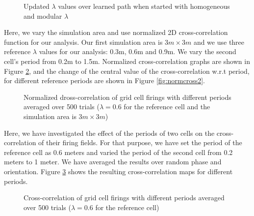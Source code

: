 \documentclass[11pt, letterpaper, onecolumn]{article}
\begin{document}
\begin{figure}[H]
\centering
{}
\caption{Updated $ \lambda $ values over learned path when started with homogeneous and modular $ \lambda $}
\label{fig:onlearn}
\end{figure}

Here, we vary the simulation area and use normalized 2D cross-correlation function for our analysis. Our first simulation area is $ 3m \times 3m $ and we use three reference $ \lambda $ values for our analysis: 0.3m, 0.6m and 0.9m. We vary the second cell's period from 0.2m to 1.5m. Normalized cross-correlation graphs are shown in Figure \ref{fig:normcross}, and the change of the central value of the cross-correlation w.r.t period, for different reference periods are shown in Figure \ref{fig:normcross2}.

\begin{figure}[H]
\centering
{}
\caption{Normalized dross-correlation of grid cell firings with different periods averaged over 500 trials ($ \lambda = 0.6 $ for the reference cell and the simulation area is $ 3m \times 3m $)}
 \label{fig:normcross}
\end{figure}

Here, we have investigated the effect of the periods of two cells on the cross-correlation of their firing fields. For that purpose, we have set the period of the reference cell as 0.6 meters and varied the period of the second cell from 0.2 meters to 1 meter. We have averaged the results over random phase and orientation. Figure \ref{fig:crossmaps} shows the resulting cross-correlation maps for different periods.

\begin{figure}[H]
\centering
{}
\caption{Cross-correlation of grid cell firings with different periods averaged over 500 trials ($ \lambda = 0.6 $ for the reference cell)}
\label{fig:crossmaps}
\end{figure}
\end{document}
